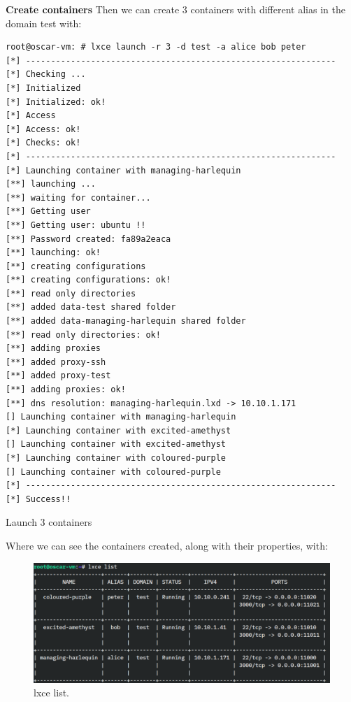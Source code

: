 \newpage
\textbf{Create containers}
Then we can create 3 containers with different alias in the domain test with:
\begin{listing}[H]
\begin{verbatim}
root@oscar-vm: # lxce launch -r 3 -d test -a alice bob peter 
[*] --------------------------------------------------------------
[*] Checking ...
[*] Initialized
[*] Initialized: ok!
[*] Access
[*] Access: ok!
[*] Checks: ok!
[*] --------------------------------------------------------------
[*] Launching container with managing-harlequin
[**] launching ...
[**] waiting for container...
[**] Getting user
[**] Getting user: ubuntu !!
[**] Password created: fa89a2eaca
[**] launching: ok!
[**] creating configurations
[**] creating configurations: ok!
[**] read only directories
[**] added data-test shared folder
[**] added data-managing-harlequin shared folder
[**] read only directories: ok!
[**] adding proxies
[**] added proxy-ssh
[**] added proxy-test
[**] adding proxies: ok!
[**] dns resolution: managing-harlequin.lxd -> 10.10.1.171
[] Launching container with managing-harlequin
[*] Launching container with excited-amethyst
[] Launching container with excited-amethyst
[*] Launching container with coloured-purple
[] Launching container with coloured-purple
[*] --------------------------------------------------------------
[*] Success!!
\end{verbatim}
\caption[lxce launch]{\footnotesize{Launch 3 containers}}
\end{listing}

\newpage
Where we can see the containers created, along with their properties, with:

\begin{figure}[H]
\label{fig:lxce list}
\centering
\includegraphics[width=\textwidth]{img/04/lxce-list.pdf}
\caption[lxce list]{\footnotesize{lxce list.}}
\end{figure}



